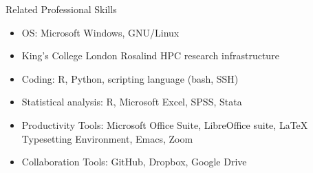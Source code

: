 \documentclass{resume2} %
\begin{document}



\begin{rSection}{Related Professional Skills}
\begin{multicols}{2}[]
  \begin{itemize}
    \item OS: \@ Microsoft Windows, GNU/Linux
    \item King's College London Rosalind HPC research infrastructure
    \item Coding: \@ R, Python, scripting language (bash, SSH)
    \item Statistical analysis: \@ R, Microsoft Excel, SPSS, Stata
	\item Productivity Tools: \@ Microsoft Office Suite, LibreOffice suite, \LaTeX \hspace{.1mm} Typesetting Environment, Emacs, Zoom
	\item Collaboration Tools: \@ GitHub, Dropbox, Google Drive
\end{itemize}
\end{multicols}
\end{rSection}

\end{document}

